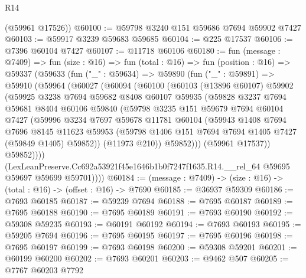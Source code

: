 \begin{lexlean}{R14}
\begin{coremodule}
      (@59961 @17526))
@60100 := @59798 @3240 @151 @59686 @7694 @59902 @7427
@60103 := @59917 @3239 @59683 @59685
@60104 := @225 @17537
@60106 := @7396 @60104 @7427
@60107 := @11718 @60106
@60180 := fun (message : @7409) =>
  fun (size : @16) =>
  fun (total : @16) =>
  fun (position : @16) =>
  @59337
    (@59633
      (fun ("_" : @59634) =>
      @59890
        (fun ("_" : @59891) =>
        @59910
          (@59964
            (@60027
              (@60094
                (@60100
                  (@60103
                    (@13896 @60107)
                    @59902
                    (@59925
                      @3238
                      @7694
                      @59682
                      @8408
                      @60107
                      @59935
                      (@59828
                        @3237
                        @7694
                        @59681
                        @8404
                        @60106
                        @59840
                        (@59798
                          @3235
                          @151
                          @59679
                          @7694
                          @60104
                          @7427
                          (@59996
                            @3234
                            @7697
                            @59678
                            @11781
                            @60104
                            (@59943
                              @1408
                              @7694
                              @7696
                              @8145
                              @11623
                              @59953
                              (@59798 @1406 @151 @7694 @7694 @1405 @7427 (@59849 @1405) @59852))
                            (@11973 @210))
                          @59852)))
                    (@59961 @17537))
                  @59852))))
          (LexLeanPreserve.Cc692a53921f45e1646b1b0f7247f1635.R14.__rel_64
            @59695
            @59697
            @59699
            @59701))))
@60184 := (message : @7409) -> (size : @16) -> (total : @16) -> (offset : @16) -> @7690
@60185 := @36937 @59309
@60186 := @7693 @60185
@60187 := @59239 @7694
@60188 := @7695 @60187
@60189 := @7695 @60188
@60190 := @7695 @60189
@60191 := @7693 @60190
@60192 := @59308 @59235
@60193 := @60191 @60192
@60194 := @7693 @60193
@60195 := @59205 @7694
@60196 := @7695 @60195
@60197 := @7695 @60196
@60198 := @7695 @60197
@60199 := @7693 @60198
@60200 := @59308 @59201
@60201 := @60199 @60200
@60202 := @7693 @60201
@60203 := @9462 @507
@60205 := @7767 @60203 @7792

\end{coremodule}
\end{lexlean}
